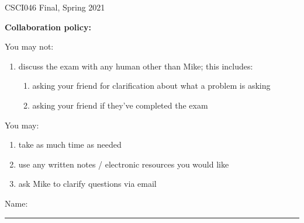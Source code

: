 \documentclass[12pt]{exam}
\theoremstyle{definition}
\begin{document}
\begin{center}
    {
\Large
    CSCI046 Final, Spring 2021
}

    \vspace{0.1in}
\end{center}

\noindent
\textbf{Collaboration policy:} 

\vspace{0.1in}
\noindent
You may not:
\begin{enumerate}
    \item discuss the exam with any human other than Mike; this includes:
        \begin{enumerate}
            \item asking your friend for clarification about what a problem is asking
            \item asking your friend if they've completed the exam
        \end{enumerate}
\end{enumerate}

\noindent
You may:
\begin{enumerate}
    \item take as much time as needed
    \item use any written notes / electronic resources you would like
    \item ask Mike to clarify questions via email
\end{enumerate}


\vspace{0.15in}

\vspace{0.25in}
\noindent
Name: 

\noindent
\rule{\textwidth}{0.1pt}
\vspace{0.15in}
\end{document}
